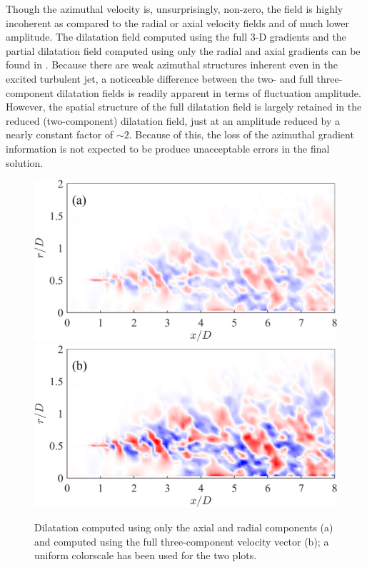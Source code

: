 Though the azimuthal velocity is, unsurprisingly, non-zero, the field is highly incoherent as compared to the radial or axial velocity fields and of much lower amplitude.
The dilatation field computed using the full 3-D gradients and the partial dilatation field computed using only the radial and axial gradients can be found in .
Because there are weak azimuthal structures inherent even in the excited turbulent jet, a noticeable difference between the two- and full three-component dilatation fields is readily apparent in terms of fluctuation amplitude.
However, the spatial structure of the full dilatation field is largely retained in the reduced (two-component) dilatation field, just at an amplitude reduced by a nearly constant factor of $\sim 2$.
Because of this, the loss of the azimuthal gradient information is not expected to be produce unacceptable errors in the final solution.
\begin{figure}
	\centering
		\includegraphics[width=0.6\linewidth]{Figures/LES_2CDil_v2.png}
		\includegraphics[width=0.6\linewidth]{Figures/LES_3CDil_v2.png}
	\caption{Dilatation computed using only the axial and radial components (a) and computed using the full three-component velocity vector (b); a uniform colorscale has been used for the two plots.}
	\label{fig:LES_streamwise_dil}
\end{figure}
 
